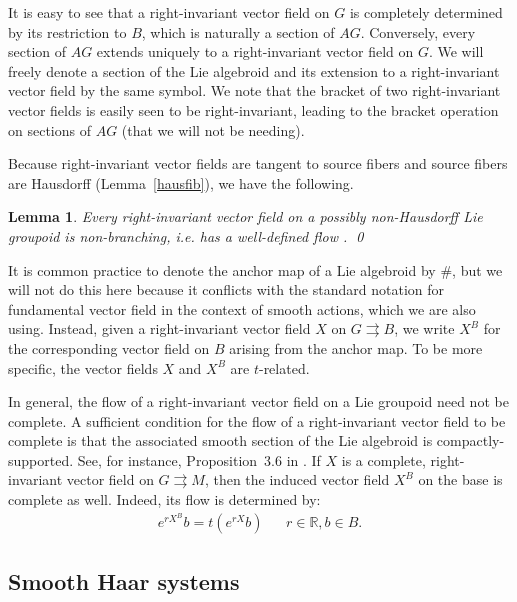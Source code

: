 \documentclass[12pt]{article}
\theoremstyle{plain}
\newtheorem{lemma}[thm]{Lemma}
\theoremstyle{definition}
\newcommand{\R}{\mathbb{R}}
\numberwithin{equation}{section}
\begin{document}
It is easy to see that a right-invariant vector field  on $G$ is completely determined by its restriction to $B$, which is naturally a section of $AG$. Conversely, every section of $AG$ extends uniquely to a right-invariant vector field on $G$. We will freely denote a section of the Lie algebroid and its extension to  a right-invariant vector field by the same symbol. We note that the bracket of two right-invariant vector fields is easily seen to be right-invariant, leading to the bracket operation on sections of $AG$ (that we will not be needing). 

Because right-invariant vector fields are tangent to source fibers and source fibers are Hausdorff (Lemma~\ref{hausfib}), we have the following.

\begin{lemma}\label{compactimpliescomplete}
Every right-invariant vector field on a possibly non-Hausdorff Lie groupoid is non-branching, i.e. has a well-defined flow . \qed
\end{lemma}


It is common practice to denote the anchor map of a Lie algebroid by $\#$, but we will not do this here because it conflicts with the standard notation for fundamental vector field in the context of smooth actions, which we are also using. Instead, given a right-invariant vector field $X$ on $G \rightrightarrows B$, we write $X^B$ for the corresponding vector field on $B$ arising from the anchor map. To be more specific, the vector fields $X$ and $X^B$ are $t$-related.


In general, the flow of a right-invariant vector field on a Lie groupoid  need not be complete. A sufficient condition for the flow of a right-invariant vector field to be complete is that the  associated smooth section of the Lie algebroid is compactly-supported. See, for instance,  Proposition~3.6 in \cite{Francis[DM]}. If $X$ is a complete, right-invariant vector field on $G \rightrightarrows M$, then the induced vector field $X^B$ on the base is complete as well. Indeed, its flow is determined by:
\begin{align*}
e^{rX^B} b = t( e^{rX} b) && r \in \R, b \in B.
\end{align*}






\subsection{Smooth Haar systems}
\end{document}
